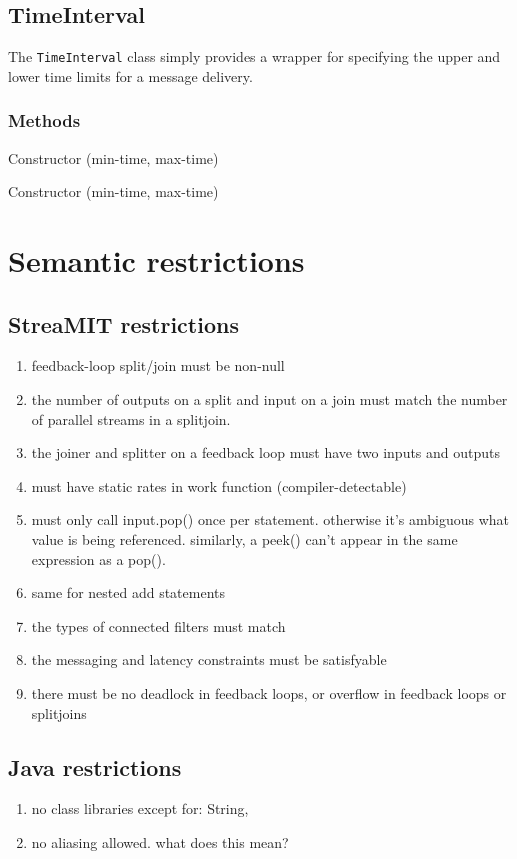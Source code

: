 \subsection{TimeInterval}

The {\tt TimeInterval} class simply provides a wrapper for specifying
the upper and lower time limits for a message delivery.

\subsubsection{Methods}

Constructor (min-time, max-time)

Constructor (min-time, max-time)

\section{Semantic restrictions}

\subsection{StreaMIT restrictions}

\begin{enumerate}

\item feedback-loop split/join must be non-null

\item the number of outputs on a split and input on a join must match the number of parallel streams in a splitjoin.

\item the joiner and splitter on a feedback loop must have two inputs and outputs

\item must have static rates in work function (compiler-detectable)

\item must only call input.pop() once per statement.  otherwise it's
ambiguous what value is being referenced.  similarly, a peek() can't
appear in the same expression as a pop().

\item same for nested add statements

\item the types of connected filters must match

\item the messaging and latency constraints must be satisfyable

\item there must be no deadlock in feedback loops, or overflow in feedback loops or splitjoins

\end{enumerate}

\subsection{Java restrictions}

\begin{enumerate}

\item no class libraries except for:  String,

\item no aliasing allowed.  what does this mean?

\end{enumerate}



